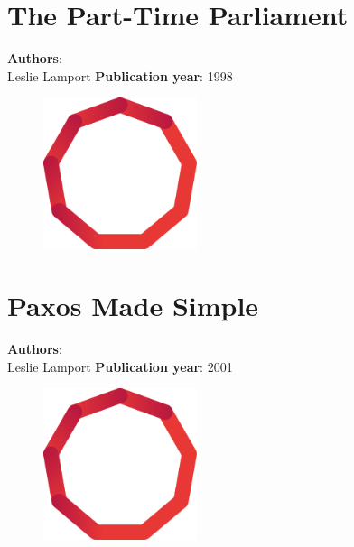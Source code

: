 \documentclass[11pt,fleqn]{book} %
\begin{document}
\chapter{The Part-Time Parliament}
\vspace*{-7mm}
\Large \textbf{Authors}: \\
Leslie Lamport
\newline\newline
\textbf{Publication year}: 1998
\begin{figure}[b]
    \centering
    \includegraphics[width=0.4\textwidth]{distributed-systems-red.pdf}
\end{figure}


\chapter{Paxos Made Simple}
\vspace*{-7mm}
\Large \textbf{Authors}: \\
Leslie Lamport
\newline\newline
\textbf{Publication year}: 2001
\begin{figure}[b]
    \centering
    \includegraphics[width=0.4\textwidth]{distributed-systems-red.pdf}
\end{figure}

\end{document}
